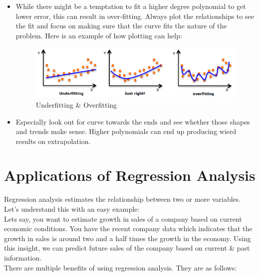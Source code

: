 \documentclass[11pt, a4paper]{report}
\begin{document}
\begin{itemize}
	\item {While there might be a temptation to fit a higher degree polynomial to get lower error, this can result in over-fitting. Always plot the relationships to see the fit and focus on making sure that the curve fits the nature of the problem. Here is an example of how plotting can help: 
				\begin{figure}[!bth]
				\center
				\includegraphics[scale=0.6]{images/underfitting-overfitting.png}
				\caption[Underfitting \& Overfitting]{Underfitting \& Overfitting \cite{desc:RegressionAnalysis}}
				\label{fig:underfittingOverfitting}
			\end{figure}

	}
	\item Especially look out for curve towards the ends and see whether those shapes and trends make sense. Higher polynomials can end up producing wierd results on extrapolation. \cite{desc:RegressionAnalysis}
\end{itemize}

\section{Applications of Regression Analysis}

Regression analysis estimates the relationship between two or more variables. Let’s understand this with an easy example: \\

Let\textquotesingle s say, you want to estimate growth in sales of a company based on current economic conditions. You have the recent company data which indicates that the growth in sales is around two and a half times the growth in the economy. Using this insight, we can predict future sales of the company based on current \& past information. \\

There are multiple benefits of using regression analysis. They are as follows:
\end{document}
